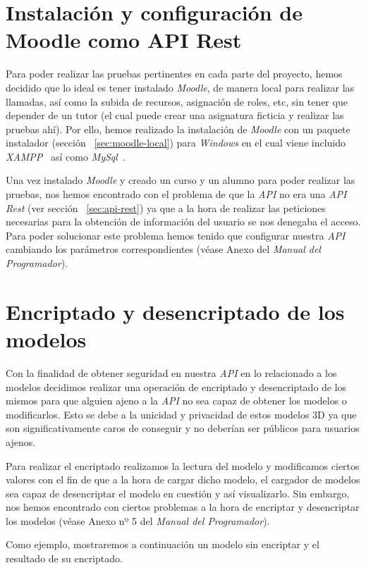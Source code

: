 \section{Instalación y configuración de Moodle como API Rest}
Para poder realizar las pruebas pertinentes en cada parte del proyecto, hemos decidido que lo ideal es tener instalado \textit{Moodle}, de manera local para realizar las llamadas, así como la subida de recursos, asignación de roles, etc, sin tener que depender de un tutor (el cual puede crear una asignatura ficticia y realizar las pruebas ahí). Por ello, hemos realizado la instalación de \textit{Moodle} con un paquete instalador (sección ~\ref{sec:moodle-local}) para \textit{Windows} en el cual viene incluido \textit{XAMPP}~\cite{wiki:xampp} así como \textit{MySql}~\cite{wiki:mysql}.

Una vez instalado \textit{Moodle} y creado un curso y un alumno para poder realizar las pruebas, nos hemos encontrado con el problema de que la \textit{API} no era una \textit{API Rest} (ver sección ~\ref{sec:api-rest}) ya que a la hora de realizar las peticiones necesarias para la obtención de información del usuario se nos denegaba el acceso. Para poder solucionar este problema hemos tenido que configurar nuestra \textit{API} cambiando los parámetros correspondientes (véase Anexo del \textit{Manual del Programador}).

\section{Encriptado y desencriptado de los modelos}
Con la finalidad de obtener seguridad en nuestra \textit{API} en lo relacionado a los modelos decidimos realizar una operación de encriptado y desencriptado de los mismos para que alguien ajeno a la \textit{API} no sea capaz de obtener los modelos o modificarlos. Esto se debe a la unicidad y privacidad de estos modelos 3D ya que son significativamente caros de conseguir y no deberían ser públicos para usuarios ajenos.

Para realizar el encriptado realizamos la lectura del modelo y modificamos ciertos valores con el fin de que a la hora de cargar dicho modelo, el cargador de modelos sea capaz de desencriptar el modelo en cuestión y así visualizarlo. Sin embargo, nos hemos encontrado con ciertos problemas a la hora de encriptar y desencriptar los modelos (véase Anexo nº 5 del \textit{Manual del Programador}).

Como ejemplo, mostraremos a continuación un modelo sin encriptar y el resultado de su encriptado.

